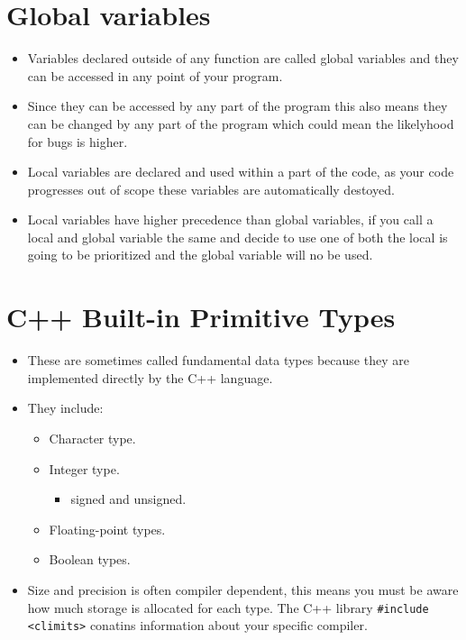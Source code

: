 \section{Global variables}
\begin{itemize}
    \item Variables declared outside of any function are called global variables and they can be accessed in any point of your program.
    \item Since they can be accessed by any part of the program this also means they can be changed by any part of the program which could mean the likelyhood for bugs is higher.
    \item Local variables are declared and used within a part of the code, as your code progresses out of scope these variables are automatically destoyed.
    \item Local variables have higher precedence than global variables, if you call a local and global variable the same and decide to use one of both the local is going to be prioritized and the global variable will no be used.
\end{itemize}


\section{C++ Built-in Primitive Types}
\begin{itemize}
    \item These are sometimes called fundamental data types because they are implemented directly by the C++ language.
    \item They include: 
        \begin{itemize}
            \item Character type.
            \item Integer type.
                \begin{itemize}
                    \item signed and unsigned.
                \end{itemize}
            \item Floating-point types.
            \item Boolean types.
        \end{itemize}
    \item Size and precision is often compiler dependent, this means you must be aware how much storage is allocated for each type. The C++ library \texttt{#include <climits>} conatins information about your specific compiler.
\end{itemize}

